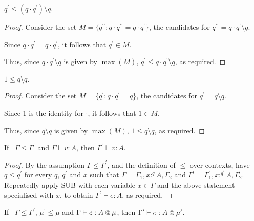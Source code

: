\documentclass[acmsmall,screen,nonacm]{acmart}
\makeatletter
\newcommand{\at}{\mathbin{\mbox{\small\ensuremath{@}}}}
\newcommand{\tee}{\vdash}
\makeatother
\begin{document}
\begin{lemma}
\label{lem:mul-left-inverse-div-le}
  $q^\prime \le (q \cdot q^\prime) \setminus q$.
\end{lemma}

\begin{proof}
  Consider the set $M = \{q^{\prime\prime} : q \cdot q^{\prime\prime} = q \cdot q^\prime\}$, the candidates for $q^{\prime\prime} = q \cdot q^\prime \setminus q$.

  Since $q \cdot q^\prime = q \cdot q^\prime$, it follows that $q^\prime \in M$.
  
  Thus, since $q \cdot q^\prime \setminus q$ is given by $\max(M)$, $q^\prime \le q \cdot q^\prime \setminus q$, as required.
  
\end{proof}

\begin{lemma}
\label{lem:div-identity}
  $1 \le q \setminus q$.
\end{lemma}

\begin{proof}
  Consider the set $M = \{q^\prime : q \cdot q^\prime = q\}$, the candidates for $q^\prime = q \setminus q$.

  Since 1 is the identity for $\cdot$, it follows that $1 \in M$.
  
  Thus, since $q \setminus q$ is given by $\max(M)$, $1 \le q \setminus q$, as required.
  
\end{proof}

\begin{theorem}
\label{thm:graded-modal-weakening-values}
  If \ $\Gamma \leq \Gamma^\prime$ and $\Gamma \tee v : A$, then $\Gamma^\prime \tee v : A$.
\end{theorem}

\begin{proof}
  By the assumption $\Gamma \leq \Gamma^\prime$, and the definition of $\le$ over contexts, have $q \le q^\prime$ for every $q$, $q^\prime$ and $x$ such that $\Gamma = \Gamma_1, x :^q A, \Gamma_2$ and $\Gamma^\prime = \Gamma_1^\prime, x :^{q^\prime} A, \Gamma_2^\prime$. Repeatedly apply SUB with each variable $x \in \Gamma$ and the above statement specialised with $x$, to obtain $\Gamma^\prime \tee e : A$, as required.
  
\end{proof}

\begin{theorem}
\label{thm:mode-qualifiers-weakening}
  If \ $\Gamma \leq \Gamma^\prime$, $\mu^\prime \leq \mu$ and $\Gamma \tee e : A \at \mu$, then $\Gamma^\prime \tee e : A \at \mu^\prime$.
\end{theorem}
\end{document}

